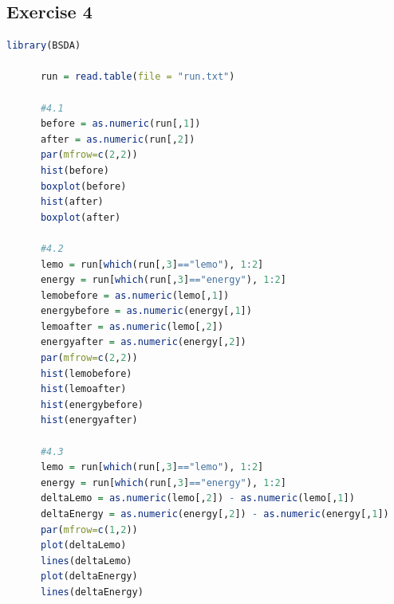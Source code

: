 \documentclass{article}
\begin{document}
    \subsection{Exercise 4}\label{sec:RE4}
      \begin{lstlisting}[language=R]
      library(BSDA)

      run = read.table(file = "run.txt")

      #4.1
      before = as.numeric(run[,1])
      after = as.numeric(run[,2])
      par(mfrow=c(2,2))
      hist(before)
      boxplot(before)
      hist(after)
      boxplot(after)

      #4.2
      lemo = run[which(run[,3]=="lemo"), 1:2]
      energy = run[which(run[,3]=="energy"), 1:2]
      lemobefore = as.numeric(lemo[,1])
      energybefore = as.numeric(energy[,1])
      lemoafter = as.numeric(lemo[,2])
      energyafter = as.numeric(energy[,2])
      par(mfrow=c(2,2))
      hist(lemobefore)
      hist(lemoafter)
      hist(energybefore)
      hist(energyafter)

      #4.3
      lemo = run[which(run[,3]=="lemo"), 1:2]
      energy = run[which(run[,3]=="energy"), 1:2]
      deltaLemo = as.numeric(lemo[,2]) - as.numeric(lemo[,1])
      deltaEnergy = as.numeric(energy[,2]) - as.numeric(energy[,1])
      par(mfrow=c(1,2))
      plot(deltaLemo)
      lines(deltaLemo)
      plot(deltaEnergy)
      lines(deltaEnergy)

      \end{lstlisting}
\end{document}
